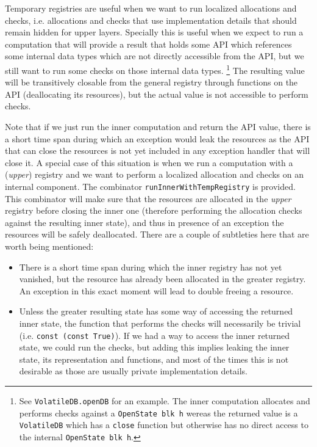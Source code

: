 Temporary registries are useful when we want to run localized allocations and
checks, i.e. allocations and checks that use implementation details that should
remain hidden for upper layers. Specially this is useful when we expect to run a
computation that will provide a result that holds some API which references some
internal data types which are not directly accessible from the API, but we still
want to run some checks on those internal data types. \footnote{See
  \lstinline!VolatileDB.openDB! for an example. The inner computation allocates
  and performs checks against a \lstinline!OpenState blk h! wereas the returned
  value is a \lstinline!VolatileDB! which has a \lstinline!close! function but
  otherwise has no direct access to the internal \lstinline!OpenState blk h!.}
The resulting value will be transitively closable from the general registry
through functions on the API (deallocating its resources), but the actual value
is not accessible to perform checks.

Note that if we just run the inner computation and return the API value, there
is a short time span during which an exception would leak the resources as the
API that can close the resources is not yet included in any exception handler
that will close it. A special case of this situation is when we run a
computation with a (\emph{upper}) registry and we want to perform a localized
allocation and checks on an internal component. The combinator
\lstinline!runInnerWithTempRegistry! is provided. This combinator will make sure
that the resources are allocated in the \emph{upper} registry before closing the
inner one (therefore performing the allocation checks against the resulting
inner state), and thus in presence of an exception the resources will be safely
deallocated. There are a couple of subtleties here that are worth being
mentioned:

\begin{itemize}
  \item There is a short time span during which the inner registry has not yet
        vanished, but the resource has already been allocated in the greater
        registry. An exception in this exact moment will lead to double freeing
        a resource.
  \item Unless the greater resulting state has some way of accessing the
        returned inner state, the function that performs the checks will
        necessarily be trivial (i.e. \lstinline!const (const True)!). If we had
        a way to access the inner returned state, we could run the checks, but
        adding this implies leaking the inner state, its representation and
        functions, and most of the times this is not desirable as those are
        usually private implementation details.
\end{itemize}

